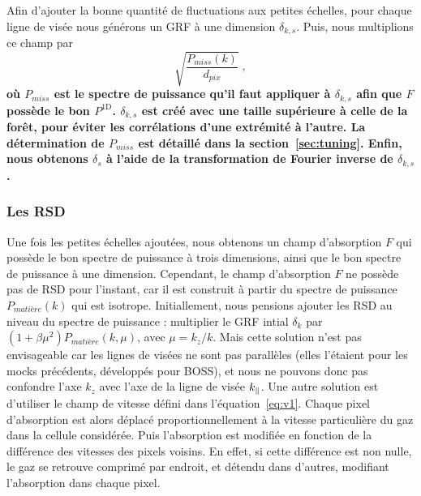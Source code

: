 \documentclass[11pt, twoside, a4paper, openright]{report}
\begin{document}
Afin d'ajouter la bonne quantité de fluctuations aux petites échelles, pour chaque ligne de visée nous générons un GRF à une dimension $\delta_{k,s}$.
Puis, nous multiplions ce champ par
\begin{equation}
  \sqrt{\frac{P_{miss}(k)}{d_{pix}}} \; ,
\end{equation}
\textbf{où $P_{miss}$ est le spectre de puissance qu'il faut appliquer à $\delta_{k,s}$ afin que $F$ possède le bon $P^{\mathrm{1D}}$. $\delta_{k,s}$ est créé avec une taille supérieure à celle de la forêt, pour éviter les corrélations d'une extrémité à l'autre. La détermination de $P_{miss}$ est détaillé dans la section~\ref{sec:tuning}. Enfin, nous obtenons $\delta_s$ à l'aide de la transformation de Fourier inverse de $\delta_{k,s}$.}

\subsubsection{Les RSD}
\label{subsubsec:rsdlya}
Une fois les petites échelles ajoutées, nous obtenons un champ d'absorption $F$ qui possède le bon spectre de puissance à trois dimensions, ainsi que le bon spectre de puissance à une dimension.
Cependant, le champ d'absorption $F$ ne possède pas de RSD pour l'instant, car il est construit à partir du spectre de puissance $P_{matière}(k)$ qui est isotrope.
Initiallement, nous pensions ajouter les RSD au niveau du spectre de puissance : multiplier le GRF intial $\delta_k$ par $(1 + \beta \mu^2)P_{matière}(k, \mu)$, avec $\mu = k_z / k$.
Mais cette solution n'est pas envisageable car les lignes de visées ne sont pas parallèles (elles l'étaient pour les mocks précédents, développés pour BOSS), et nous ne pouvons donc pas confondre l'axe $k_z$ avec l'axe de la ligne de visée $k_{\parallel}{}$.
Une autre solution est d'utiliser le champ de vitesse défini dans l'équation~\ref{eq:v1}. Chaque pixel d'absorption est alors déplacé proportionnellement à la vitesse particulière du gaz dans la cellule considérée. Puis l'absorption est modifiée en fonction de la différence des vitesses des pixels voisins. En effet, si cette différence est non nulle, le gaz se retrouve comprimé par endroit, et détendu dans d'autres, modifiant l'absorption dans chaque pixel.
\end{document}
